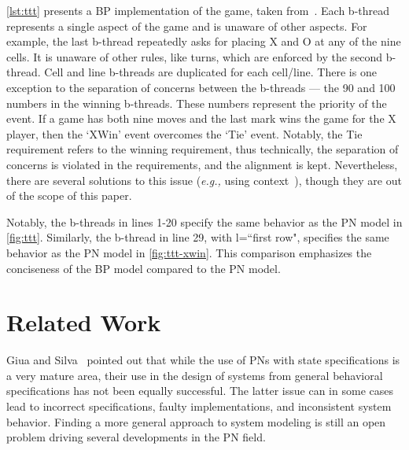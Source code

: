 \documentclass[10pt,journal,compsoc]{IEEEtran}
\theoremstyle{definition}
\newcommand{\eg}{\emph{e.g.,}\xspace}
\begin{document}
\autoref{lst:ttt} presents a BP implementation of the game, taken from~\cite{harel2010programming}. Each b-thread represents a single aspect of the game and is unaware of other aspects. For example, the last b-thread repeatedly asks for placing X and O at any of the nine cells. It is unaware of other rules, like turns, which are enforced by the second b-thread. Cell and line b-threads are duplicated for each cell/line. There is one exception to the separation of concerns between the b-threads --- the 90 and 100 numbers in the winning b-threads. These numbers represent the priority of the event. If a game has both nine moves and the last mark wins the game for the X player, then the `XWin' event overcomes the `Tie' event. Notably, the Tie requirement refers to the winning requirement, thus technically, the separation of concerns is violated in the requirements, and the alignment is kept. Nevertheless, there are several solutions to this issue (\eg using context~\cite{Elyasaf2020COBP}), though they are out of the scope of this paper.

Notably, the b-threads in lines 1-20 specify the same behavior as the PN model in \autoref{fig:ttt}. Similarly, the b-thread in line 29, with l=``first row", specifies the same behavior as the PN model in \autoref{fig:ttt-xwin}. This comparison emphasizes the conciseness of the BP model compared to the PN model. 


\section{Related Work}
\label{sec:related-work}


Giua and Silva~\cite{giua2017modeling} pointed out that while the use of PNs with state specifications is a very mature area, their use in the design of systems from general behavioral specifications has not been equally successful. The latter issue can in some cases lead to incorrect specifications, faulty implementations, and inconsistent system behavior. Finding a more general approach to system modeling is still an open problem driving several developments in the PN field.
\end{document}
